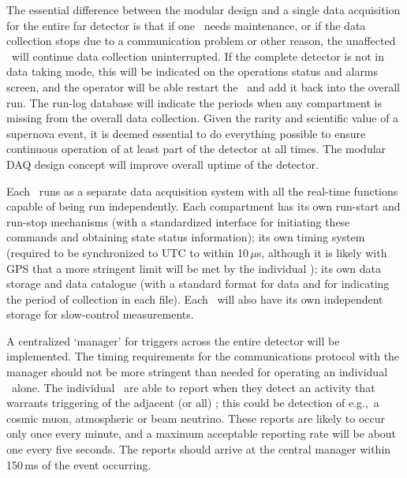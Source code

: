 The essential difference between the modular design and a single data
acquisition for the entire far detector is that if one \COMPARTMENT\
needs maintenance, or if the data collection stops due to a
communication problem or other reason, the unaffected \COMPARTMENTS\ will
continue data collection uninterrupted.  If the complete detector is
not in data taking mode, this will be indicated on the operations
status and alarms screen, and the operator will be able restart the
\COMPARTMENT\ and add it back into the overall run.  The run-log
database will indicate the periods when any compartment is missing
from the overall data collection. 
Given the rarity and scientific value of a supernova event, it is deemed
essential to do everything possible to ensure continuous operation of at least part of the detector at all times.
The modular DAQ design
concept will improve overall uptime of the detector.

Each \COMPARTMENT\ runs as a separate data acquisition system with all
the real-time functions capable of being run independently.
Each compartment has its own run-start and run-stop mechanisms (with a
standardized interface for initiating these commands and obtaining
state status information); its own timing system (required to be
synchronized to UTC to within 10\,$\mu$s, although it is likely with GPS
that a more stringent limit will be met by the individual
\COMPARTMENTS); its own data storage and data catalogue (with
a standard format for data and for indicating the period of collection
in each file).   Each \COMPARTMENT\ will also have its own independent
storage for slow-control measurements.

A centralized `manager' for triggers across the entire detector will
be implemented.   The timing requirements for the communications protocol with the manager should not be more stringent than needed for operating an individual \COMPARTMENT\ alone.
The individual \COMPARTMENTS\ are able to report when they detect an activity that warrants triggering of the adjacent (or all) \COMPARTMENTS;
this could be detection of  e.g.,\ a cosmic muon, atmospheric or beam neutrino.  These reports are likely to occur only once every minute,
and a maximum acceptable reporting rate %
will be about one every five seconds.  The reports should arrive at
the central manager within 150\,ms of the event occurring.

